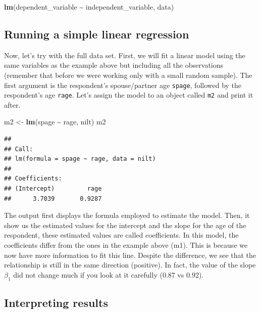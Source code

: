 \documentclass[
]{book}
\newenvironment{Shaded}{\begin{snugshade}}{\end{snugshade}}
\newcommand{\FunctionTok}[1]{\textcolor[rgb]{0.13,0.29,0.53}{\textbf{#1}}}
\newcommand{\NormalTok}[1]{#1}
\newcommand{\OtherTok}[1]{\textcolor[rgb]{0.56,0.35,0.01}{#1}}
\newcommand{\SpecialCharTok}[1]{\textcolor[rgb]{0.81,0.36,0.00}{\textbf{#1}}}
\begin{document}
\begin{Shaded}
\begin{Highlighting}[]
\FunctionTok{lm}\NormalTok{(dependent\_variable }\SpecialCharTok{\textasciitilde{}}\NormalTok{ independent\_variable, data)}
\end{Highlighting}
\end{Shaded}

\hypertarget{running-a-simple-linear-regression}{%
\subsection{Running a simple linear regression}\label{running-a-simple-linear-regression}}

Now, let's try with the full data set. First, we will fit a linear model using the same variables as the example above but including all the observations (remember that before we were working only with a small random sample). The first argument is the respondent's spouse/partner age \texttt{spage}, followed by the respondent's age \texttt{rage}. Let's assign the model to an object called \texttt{m2} and print it after.

\begin{Shaded}
\begin{Highlighting}[]
\NormalTok{m2 }\OtherTok{\textless{}{-}} \FunctionTok{lm}\NormalTok{(spage }\SpecialCharTok{\textasciitilde{}}\NormalTok{ rage, nilt)}
\NormalTok{m2}
\end{Highlighting}
\end{Shaded}

\begin{verbatim}
## 
## Call:
## lm(formula = spage ~ rage, data = nilt)
## 
## Coefficients:
## (Intercept)         rage  
##      3.7039       0.9287
\end{verbatim}

The output first displays the formula employed to estimate the model. Then, it show us the estimated values for the intercept and the slope for the age of the respondent, these estimated values are called coefficients. In this model, the coefficients differ from the ones in the example above (m1). This is because we now have more information to fit this line. Despite the difference, we see that the relationship is still in the same direction (positive). In fact, the value of the slope \(\beta_1\) did not change much if you look at it carefully (0.87 vs 0.92).

\hypertarget{interpreting-results}{%
\subsection{Interpreting results}\label{interpreting-results}}
\end{document}
